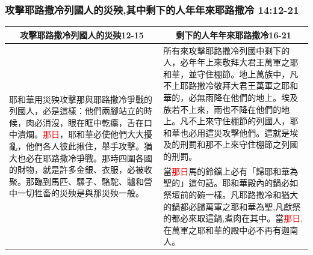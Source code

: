 \subsubsection{攻擊耶路撒冷列國人的災殃,其中剩下的人年年來耶路撒冷 14:12-21}
\begin{table}[H]
\centering
\begin{tabular}{p{6.5cm}|p{11cm}}\hline\hline
\multicolumn{1}{c|}{攻擊耶路撒冷列國人的災殃12-15}&\multicolumn{1}{c}{剩下的人年年來耶路撒冷16-21}\\\hline
\multirow{2}{6.5cm}{耶和華用災殃攻擊那與耶路撒冷爭戰的列國人，必是這樣：他們兩腳站立的時候，肉必消沒，眼在眶中乾癟，舌在口中潰爛。\textcolor{red}{那日}，耶和華必使他們大大擾亂，他們各人彼此揪住，舉手攻擊。猶大也必在耶路撒冷爭戰。那時四圍各國的財物，就是許多金銀、衣服，必被收聚。那臨到馬匹、騾子、駱駝、驢和營中一切牲畜的災殃是與那災殃一般。}
&所有來攻擊耶路撒冷列國中剩下的人，必年年上來敬拜大君王萬軍之耶和華，並守住棚節。地上萬族中，凡不上耶路撒冷敬拜大君王萬軍之耶和華的，必無雨降在他們的地上。埃及族若不上來，雨也不降在他們的地上。凡不上來守住棚節的列國人，耶和華也必用這災攻擊他們。這就是埃及的刑罰和那不上來守住棚節之列國的刑罰。\\\cline{2-2}
&當\textcolor{red}{那日}馬的鈴鐺上必有「歸耶和華為聖的」這句話。耶和華殿內的鍋必如祭壇前的碗一樣。凡耶路撒冷和猶大的鍋都必歸萬軍之耶和華為聖,凡獻祭的都必來取這鍋,煮肉在其中。當\textcolor{red}{那日},在萬軍之耶和華的殿中必不再有迦南人。\\\hline
\end{tabular}
\end{table}






